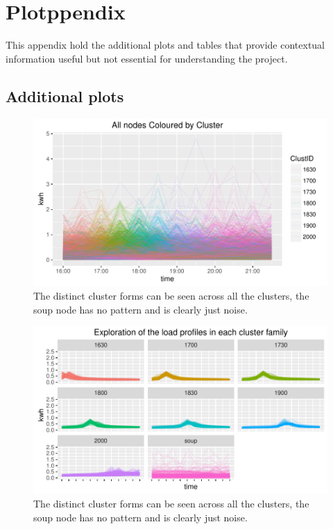 
\appendix
\chapter{Plotppendix}
\label{Plotpend}
This appendix hold the additional plots and tables that provide contextual information useful but not essential for understanding the project.  


\section{Additional plots}

\begin{figure}
    \centering
    \includegraphics[width = \textwidth]{Figures/Appendix/AllNodesClustercolour}
    \caption[All Nodes for one day]{The distinct cluster forms can be seen across all the clusters, the soup node has no pattern and is clearly just noise.}
    \label{fig:AllNodesClustercolour}
\end{figure}


\begin{figure}
    \centering
    \includegraphics[width = \textwidth]{Figures/Appendix/AllCLustFamilies}
    \caption[All Clusters grouped by family]{The distinct cluster forms can be seen across all the clusters, the soup node has no pattern and is clearly just noise.}
    \label{fig:AllCLustFamilies}
\end{figure}

